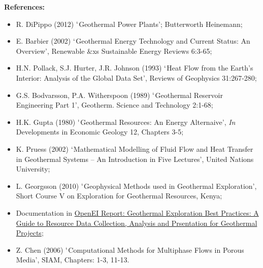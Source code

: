 \documentclass[12pts,a4paper,amsmath,amssymb,floatfix]{article}%
\begin{document}
\begin{enumerate}[label=\bfseries Project \arabic*:]
\noindent
{\bf References:}
\begin{itemize}
\item R. DiPippo (2012) $\lq$Geothermal Power Plants'; Butterworth Heinemann;
\item E. Barbier (2002) $\lq$Geothermal Energy Technology and Current Status: An Overview', Renewable $\&$xs Sustainable Energy Reviews 6:3-65;
\item H.N. Pollack, S.J. Hurter, J.R. Johnson (1993) $\lq$Heat Flow from the Earth's Interior: Analysis of the Global Data Set', Reviews of Geophysics 31:267-280;
\item G.S. Bodvarsson, P.A. Witherspoon (1989) $\lq$Geothermal Reservoir Engineering Part 1', Geotherm. Science and Technology 2:1-68;
\item H.K. Gupta (1980) $\lq$Geothermal Resources: An Energy Alternaive', {\it In} Developments in Economic Geology 12, Chapters 3-5;
\item K. Pruess (2002) $\lq$Mathematical Modelling of Fluid Flow and Heat Transfer in Geothermal Systems -- An Introduction in Five Lectures', United Nations University;
\item L. Georgsson (2010) $\lq$Geophysical Methods used in Geothermal Exploration', Short Course V on Exploration for Geothermal Resources, Kenya;
\item Documentation in \href{http://en.openei.org/wiki/Geothermal_Exploration_Best_Practices:_A_Guide_to_Resource_Data_Collection,_Analysis_and_Presentation_for_Geothermal_Projects}{OpenEI Report: Geothermal Exploration Best Practices: A Guide to Resource Data Collection, Analysis and Prsentation for Geothermal Projects};
\item Z. Chen (2006) $\lq$Computational Methods for Multiphase Flows in Porous Media', SIAM, Chapters: 1-3, 11-13.
\end{itemize}


\end{enumerate}
\end{document}
